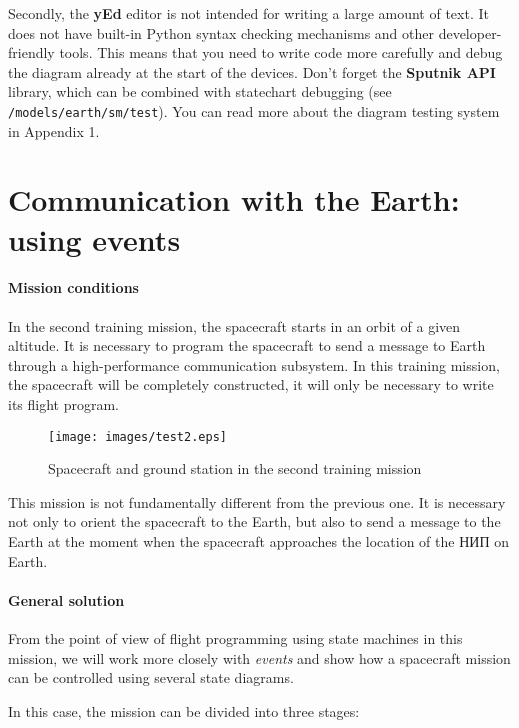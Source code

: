\documentclass[12pt,a4paper]{article}
\begin{document}
Secondly, the \textbf{yEd} editor is not intended for writing a large amount of text. It does not have built-in Python syntax checking mechanisms and other developer-friendly tools. This means that you need to write code more carefully and debug the diagram already at the start of the devices. Don't forget the \textbf{Sputnik API} library, which can be combined with statechart debugging
(see \verb'/models/earth/sm/test'). You can read more about the diagram testing system in Appendix 1.

\clearpage
\section{Communication with the Earth: using events}

\paragraph{Mission conditions} In the second training mission, the spacecraft starts in an orbit of a given altitude. It is necessary to program the spacecraft to send a message to Earth through a high-performance communication subsystem. In this training mission, the spacecraft will be completely constructed, it will only be necessary to write its flight program.

\begin{figure}[tbh]
  \begin{center}
    \texttt{[image: images/test2.eps]}
    \caption{Spacecraft and ground station in the second training mission}
    \label{Pic:test2}
  \end{center}
\end{figure}

This mission is not fundamentally different from the previous one. It is necessary not only to orient the spacecraft to the Earth, but also to send a message to the Earth at the moment when the spacecraft approaches the location of the НИП on Earth.

\paragraph{General solution} From the point of view of flight programming using state machines in this mission, we will work more closely with \emph{events} and show how a spacecraft mission can be controlled using several state diagrams.

In this case, the mission can be divided into three stages:
\end{document}
